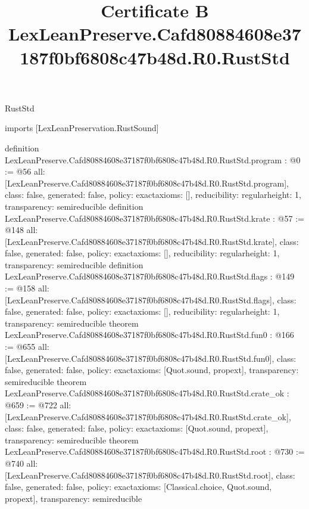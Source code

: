 \begin{lexlean}{RustStd}
\title{Certificate B LexLeanPreserve.Cafd80884608e37187f0bf6808c47b48d.R0.RustStd}
\begin{coremodule}
imports [LexLeanPreservation.RustSound]

definition LexLeanPreserve.Cafd80884608e37187f0bf6808c47b48d.R0.RustStd.program : @0 := @56 {
  all: [LexLeanPreserve.Cafd80884608e37187f0bf6808c47b48d.R0.RustStd.program],
  class: false,
  generated: false,
  policy: exact{axioms: []},
  reducibility: regular{height: 1},
  transparency: semireducible
}
definition LexLeanPreserve.Cafd80884608e37187f0bf6808c47b48d.R0.RustStd.krate : @57 := @148 {
  all: [LexLeanPreserve.Cafd80884608e37187f0bf6808c47b48d.R0.RustStd.krate],
  class: false,
  generated: false,
  policy: exact{axioms: []},
  reducibility: regular{height: 1},
  transparency: semireducible
}
definition LexLeanPreserve.Cafd80884608e37187f0bf6808c47b48d.R0.RustStd.flags : @149 := @158 {
  all: [LexLeanPreserve.Cafd80884608e37187f0bf6808c47b48d.R0.RustStd.flags],
  class: false,
  generated: false,
  policy: exact{axioms: []},
  reducibility: regular{height: 1},
  transparency: semireducible
}
theorem LexLeanPreserve.Cafd80884608e37187f0bf6808c47b48d.R0.RustStd.fun0 : @166 := @655 {
  all: [LexLeanPreserve.Cafd80884608e37187f0bf6808c47b48d.R0.RustStd.fun0],
  class: false,
  generated: false,
  policy: exact{axioms: [Quot.sound, propext]},
  transparency: semireducible
}
theorem LexLeanPreserve.Cafd80884608e37187f0bf6808c47b48d.R0.RustStd.crate_ok : @659 := @722 {
  all: [LexLeanPreserve.Cafd80884608e37187f0bf6808c47b48d.R0.RustStd.crate_ok],
  class: false,
  generated: false,
  policy: exact{axioms: [Quot.sound, propext]},
  transparency: semireducible
}
theorem LexLeanPreserve.Cafd80884608e37187f0bf6808c47b48d.R0.RustStd.root : @730 := @740 {
  all: [LexLeanPreserve.Cafd80884608e37187f0bf6808c47b48d.R0.RustStd.root],
  class: false,
  generated: false,
  policy: exact{axioms: [Classical.choice, Quot.sound, propext]},
  transparency: semireducible
}


\end{coremodule}
\end{lexlean}
